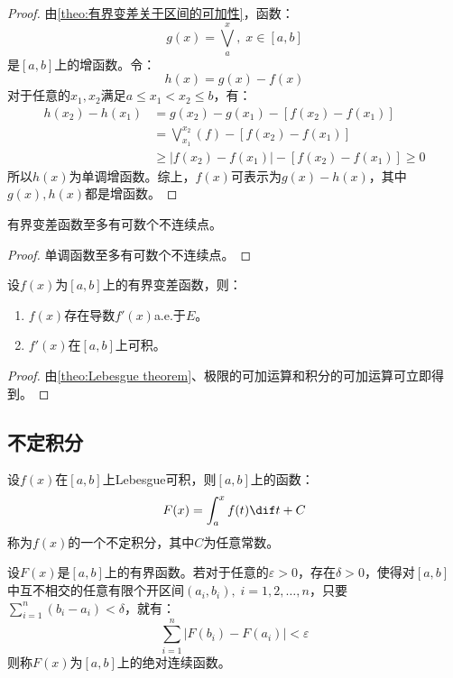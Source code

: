 \begin{proof}
	由\cref{theo:有界变差关于区间的可加性}，函数：
	\begin{equation*}
		g(x)=\bigvee_{a}^{x},\;x\in[a,b]
	\end{equation*}
	是$[a,b]$上的增函数。令：
	\begin{equation*}
		h(x)=g(x)-f(x)
	\end{equation*}
	对于任意的$x_1,x_2$满足$a\leqslant x_1<x_2\leqslant b$，有：
	\begin{align*}
		h(x_2)-h(x_1)
		&=g(x_2)-g(x_1)-[f(x_2)-f(x_1)] \\
		&=\bigvee_{x_1}^{x_2}(f)-[f(x_2)-f(x_1)] \\
		&\geqslant|f(x_2)-f(x_1)|-[f(x_2)-f(x_1)]\geqslant0
	\end{align*}
	所以$h(x)$为单调增函数。综上，$f(x)$可表示为$g(x)-h(x)$，其中$g(x),h(x)$都是增函数。
\end{proof}
\begin{corollary}
	有界变差函数至多有可数个不连续点。
\end{corollary}
\begin{proof}
	单调函数至多有可数个不连续点。
\end{proof}
\begin{corollary}
	设$f(x)$为$[a,b]$上的有界变差函数，则：
	\begin{enumerate}
		\item $f(x)$存在导数$f'(x)$a.e.于$E$。
		\item $f'(x)$在$[a,b]$上可积。
	\end{enumerate}
\end{corollary}
\begin{proof}
	由\cref{theo:Lebesgue theorem}、极限的可加运算和积分的可加运算可立即得到。
\end{proof}

\subsection{不定积分}
\begin{definition}
	设$f(x)$在$[a,b]$上Lebesgue可积，则$[a,b]$上的函数：
	\begin{equation*}
		F(x)=\int_{a}^{x}f(t)\dif t+C
	\end{equation*}
	称为$f(x)$的一个不定积分，其中$C$为任意常数。
\end{definition}
\begin{definition}
	设$F(x)$是$[a,b]$上的有界函数。若对于任意的$\varepsilon>0$，存在$\delta>0$，使得对$[a,b]$中互不相交的任意有限个开区间$(a_i,b_i),\;i=1,2,\dots,n$，只要$\sum\limits_{i=1}^{n}(b_i-a_i)<\delta$，就有：
	\begin{equation*}
		\sum_{i=1}^{n}|F(b_i)-F(a_i)|<\varepsilon
	\end{equation*}
	则称$F(x)$为$[a,b]$上的绝对连续函数。
\end{definition}
